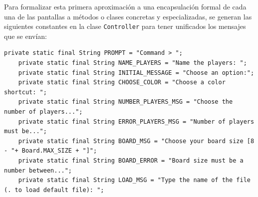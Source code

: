 \documentclass{article}
\theoremstyle{break}
\begin{document}
Para formalizar esta primera aproximación a una encapsulación formal de cada una de las pantallas a métodos o clases concretas y especializadas, se generan las siguientes constantes en la clase \texttt{Controller} para tener unificados los mensajes que se envían:
\begin{lstlisting}
private static final String PROMPT = "Command > ";
	private static final String NAME_PLAYERS = "Name the players: ";
	private static final String INITIAL_MESSAGE = "Choose an option:";
	private static final String CHOOSE_COLOR = "Choose a color shortcut: ";
	private static final String NUMBER_PLAYERS_MSG = "Choose the number of players...";
	private static final String ERROR_PLAYERS_MSG = "Number of players must be...";
	private static final String BOARD_MSG = "Choose your board size [8 - "+ Board.MAX_SIZE + "]";
	private static final String BOARD_ERROR = "Board size must be a number between...";
	private static final String LOAD_MSG = "Type the name of the file (. to load default file): ";
\end{lstlisting}
\end{document}
